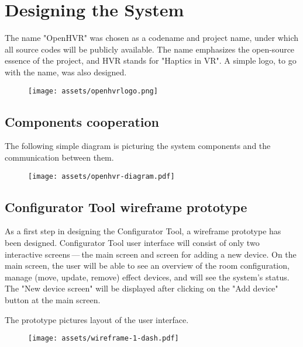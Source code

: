 \chapter{Designing the System}

The name "OpenHVR" was chosen as a codename and project name, under which
all source codes will be publicly available. The name emphasizes the open-source
essence of the project, and HVR stands for "Haptics in VR". A simple logo, to
go with the name, was also designed.


\begin{figure}[h]{}
\centering\texttt{[image: assets/openhvrlogo.png]}
\caption{}

\end{figure}

\hypertarget{x-components-cooperation}{\section{Components cooperation}}
The following simple diagram is picturing the system components and the
communication between them.


\begin{figure}[h]{}
\centering\texttt{[image: assets/openhvr-diagram.pdf]}
\caption{}

\end{figure}


\hypertarget{x-configurator-tool-wireframe-prototype}{\section{Configurator Tool wireframe prototype}}
As a first step in designing the Configurator Tool, a wireframe prototype
has been designed. Configurator Tool user interface will consist of only
two interactive screens — the main screen and screen for adding a new device.
On the main screen, the user will be able to see an overview of the room configuration,
manage (move, update, remove) effect devices, and will see the system’s status.
The "New device screen" will be displayed after clicking on the "Add device"
button at the main screen.


The prototype pictures layout of the user interface.


\begin{figure}[h]{}
\centering\texttt{[image: assets/wireframe-1-dash.pdf]}
\caption{}

\end{figure}

